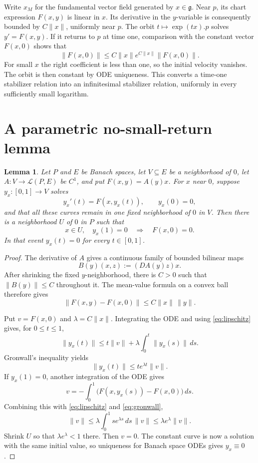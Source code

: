 \documentclass[11pt]{article}
\newtheorem{lemma}[theorem]{Lemma}
\newcommand{\g}{\mathfrak g}
\begin{document}
Write $x_M$ for the fundamental vector field generated by $x\in\g$.  Near
$p$, its chart expression $F(x,y)$ is linear in $x$.  Its derivative in the
$y$-variable is consequently bounded by $C\|x\|$, uniformly near $p$.
The orbit $t\mapsto\exp(tx).p$ solves $y'=F(x,y)$.  If it returns to $p$ at
time one, comparison with the constant vector $F(x,0)$ shows that
\[
 \|F(x,0)\|\leq C\|x\|e^{C\|x\|}\|F(x,0)\|.
\]
For small $x$ the right coefficient is less than one, so the initial velocity
vanishes.  The orbit is then constant by ODE uniqueness.  This converts a
time-one stabilizer relation into an infinitesimal stabilizer relation,
uniformly in every sufficiently small logarithm.

\section{A parametric no-small-return lemma}

\begin{lemma}\label{lem:return}
Let $P$ and $E$ be Banach spaces, let $V\subseteq E$ be a neighborhood of
$0$, let $A:V\to\mathcal L(P,E)$ be $C^1$, and put
$F(x,y)=A(y)x$.
For $x$ near $0$, suppose $y_x:[0,1]\to V$ solves
\[
 y_x'(t)=F(x,y_x(t)),\qquad y_x(0)=0,
\]
and that all these curves remain in one fixed neighborhood of $0$ in $V$.
Then there is a neighborhood $U$ of $0$ in $P$ such that
\[
 x\in U,\quad y_x(1)=0 \quad\Longrightarrow\quad F(x,0)=0.
\]
In that event $y_x(t)=0$ for every $t\in[0,1]$.
\end{lemma}

\begin{proof}
The derivative of $A$ gives a continuous family of bounded bilinear maps
\[
 B(y)(x,z):=(DA(y)z)x.
\]
After shrinking the fixed $y$-neighborhood, there is $C>0$ such that
$\|B(y)\|\leq C$ throughout it.  The mean-value formula on a convex ball
therefore gives
\begin{equation}\label{eq:lipschitz}
 \|F(x,y)-F(x,0)\|\leq C\|x\|\,\|y\|.
\end{equation}

Put $v=F(x,0)$ and $\lambda=C\|x\|$.  Integrating the ODE and using
\eqref{eq:lipschitz} gives, for $0\leq t\leq1$,
\[
 \|y_x(t)\|\leq t\|v\|+\lambda\int_0^t\|y_x(s)\|\,ds.
\]
Gronwall's inequality yields
\begin{equation}\label{eq:gronwall}
 \|y_x(t)\|\leq t e^{\lambda t}\|v\|.
\end{equation}
If $y_x(1)=0$, another integration of the ODE gives
\[
 v=-\int_0^1\big(F(x,y_x(s))-F(x,0)\big)\,ds.
\]
Combining this with \eqref{eq:lipschitz} and \eqref{eq:gronwall},
\[
 \|v\|
 \leq\lambda\int_0^1s e^{\lambda s}\,ds\,\|v\|
 \leq\lambda e^\lambda\|v\|.
\]
Shrink $U$ so that $\lambda e^\lambda<1$ there.  Then $v=0$.  The constant
curve is now a solution with the same initial value, so uniqueness for Banach
space ODEs gives $y_x\equiv0$.
\end{proof}
\end{document}
